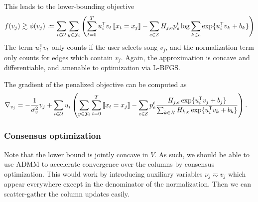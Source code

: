 \documentclass{article}
\def\E{\ensuremath{\mathcal{E}}}
\def\U{\ensuremath{\mathcal{U}}}
\begin{document}
This leads to the lower-bounding objective 
\begin{equation}
f(v_j) \gtrsim \phi(v_j) \defeq \sum_{i \in \U} \sum_{y \in \Y_i} \left(\sum_{t=0}^T u_i\trans v_t \ind{x_t = x_j} - \sum_{e \in \E} H_{j,e} p_e^t \log \sum_{k\in e} \exp\{u_i\trans v_k + b_k\} \right)
\end{equation}
The term $u_i^\mathsf{T} v_t$ only counts if the user selects song $v_j$, and the normalization term only counts for edges which contain $v_j$.  Again, the approximation is concave and
differentiable, and amenable to optimization via L-BFGS.

The gradient of the penalized objective can be computed as 
\begin{align}
\nabla_{v_j} &= -\frac{1}{\sigma_v^2} v_j + \sum_{i \in \U}u_i \left(\sum_{y \in \Y_i} \sum_{t=0}^T \ind{x_t=x_j} - \sum_{e \in \E} p_e^t \frac{H_{j,e} \exp\{u_i\trans v_j +
b_j\}}{\sum_{k\in\X} H_{k,e} \exp\{u_i\trans v_k + b_k\}}\right).
\end{align}

\subsubsection{Consensus optimization}
Note that the lower bound is jointly concave in $V$. As such, we should be able to use ADMM to accelerate convergence over the columns by consensus optimization.  This would work by
introducing auxiliary variables $\nu_j \eqsim v_j$ which appear everywhere except in the denominator of the normalization.  Then we can scatter-gather the column updates easily.

\end{document}
